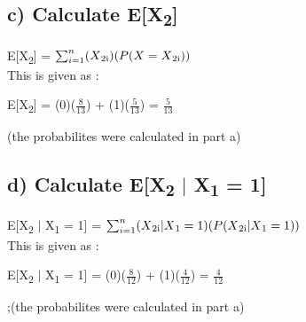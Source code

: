 \documentclass{report}
\begin{document}
		
		

		\subsection*{c) Calculate E[X\textsubscript{2}]}
		E[X\textsubscript{2}] = $\sum_{i=1}^{n} (X\textsubscript{2i})(P(X = X\textsubscript{2i}))$\\
		This is given as :
		\begin{center}
			E[X\textsubscript{2}] = (0)($\frac{8}{13}$) + (1)($\frac{5}{13}$) = $\frac{5}{13}$
		\end{center}
		(the probabilites were calculated in part a)
		
		

		\subsection*{d) Calculate E[X\textsubscript{2} $\vert$ X\textsubscript{1} = 1]}
		E[X\textsubscript{2} $\vert$ X\textsubscript{1} = 1] = $\sum_{i=1}^{n} (X\textsubscript{2i} \vert X\textsubscript{1} = 1)(P(X\textsubscript{2i} \vert X\textsubscript{1} = 1))$\\
		This is given as :
		\begin{center}
			E[X\textsubscript{2} $\vert$ X\textsubscript{1} = 1] = (0)($\frac{8}{12}$) + (1)($\frac{4}{12}$) = $\frac{4}{12}$
		\end{center}
		;(the probabilites were calculated in part a)
		
		
	
		
	
	
		
		
\end{document}
